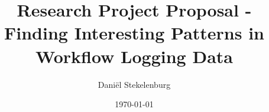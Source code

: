 \documentclass[a4paper,11pt]{article}
\begin{document}
\theoremstyle{plain}
\newtheorem{thm}{Theorem}{}

\theoremstyle{definition}
\newtheorem{defn}[thm]{Definition}

\renewcommand{\vec}[1]{\mathbf{#1}}

\title{Research Project Proposal - Finding Interesting Patterns in Workflow Logging Data}
\date{\today}
\author{
        Dani\"el Stekelenburg		
}
 
 
\maketitle

\abstract{}



\end{document}
